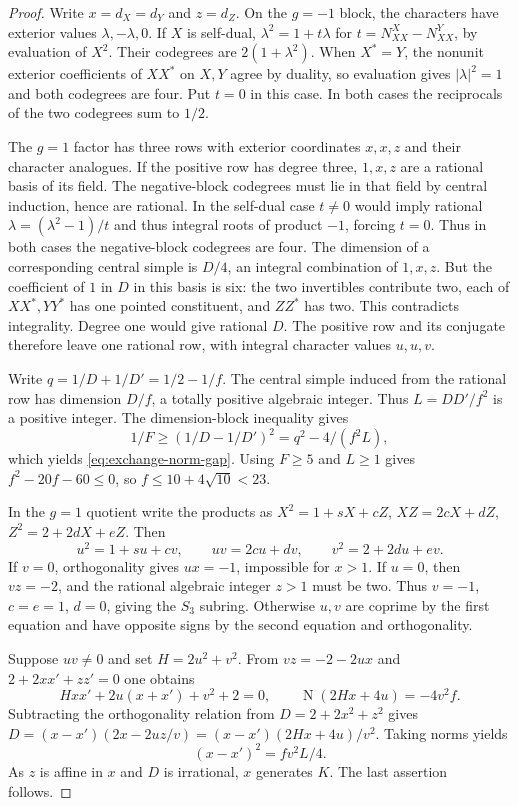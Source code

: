 \documentclass[11pt,a4paper]{article}
\numberwithin{equation}{section}
\begin{document}
\begin{proof}
Write $x=d_X=d_Y$ and $z=d_Z$.
On the $g=-1$ block, the characters have exterior values $\lambda,-\lambda,0$. If $X$ is self-dual, $\lambda^2=1+t\lambda$ for $t=N_{XX}^X-N_{XX}^Y$, by evaluation of $X^2$. Their codegrees are $2(1+\lambda^2)$. When $X^*=Y$, the nonunit exterior coefficients of $XX^*$ on $X,Y$ agree by duality, so evaluation gives $|\lambda|^2=1$ and both codegrees are four. Put $t=0$ in this case. In both cases the reciprocals of the two codegrees sum to $1/2$.

The $g=1$ factor has three rows with exterior coordinates $x,x,z$ and their character analogues. If the positive row has degree three, $1,x,z$ are a rational basis of its field. The negative-block codegrees must lie in that field by central induction, hence are rational. In the self-dual case $t\ne0$ would imply rational $\lambda=(\lambda^2-1)/t$ and thus integral roots of product $-1$, forcing $t=0$. Thus in both cases the negative-block codegrees are four. The dimension of a corresponding central simple is $D/4$, an integral combination of $1,x,z$. But the coefficient of $1$ in $D$ in this basis is six: the two invertibles contribute two, each of $XX^*,YY^*$ has one pointed constituent, and $ZZ^*$ has two. This contradicts integrality. Degree one would give rational $D$. The positive row and its conjugate therefore leave one rational row, with integral character values $u,u,v$.

Write $q=1/D+1/D'=1/2-1/f$. The central simple induced from the rational row has dimension $D/f$, a totally positive algebraic integer. Thus $L=DD'/f^2$ is a positive integer. The dimension-block inequality gives
\[
 1/F\ge(1/D-1/D')^2=q^2-4/(f^2L),
\]
which yields \eqref{eq:exchange-norm-gap}. Using $F\ge5$ and $L\ge1$ gives $f^2-20f-60\le0$, so $f\le 10+4\sqrt{10}<23$.

In the $g=1$ quotient write the products as
$X^2=1+sX+cZ$, $XZ=2cX+dZ$, $Z^2=2+2dX+eZ$. Then
\begin{equation}\label{eq:exchange-rational}
 u^2=1+su+cv,\qquad uv=2cu+dv,\qquad v^2=2+2du+ev .
\end{equation}
If $v=0$, orthogonality gives $ux=-1$, impossible for $x>1$. If $u=0$, then $vz=-2$, and the rational algebraic integer $z>1$ must be two. Thus $v=-1$, $c=e=1$, $d=0$, giving the $S_3$ subring. Otherwise $u,v$ are coprime by the first equation and have opposite signs by the second equation and orthogonality.

Suppose $uv\ne0$ and set $H=2u^2+v^2$. From $vz=-2-2ux$ and $2+2xx'+zz'=0$ one obtains
\[
 Hxx'+2u(x+x')+v^2+2=0,\qquad
 \operatorname{N}(2Hx+4u)=-4v^2 f .
\]
Subtracting the orthogonality relation from $D=2+2x^2+z^2$ gives
$D=(x-x')(2x-2uz/v)=(x-x')(2Hx+4u)/v^2$. Taking norms yields
\begin{equation}\label{eq:exchange-discriminant}
 (x-x')^2=fv^2L/4 .
\end{equation}
As $z$ is affine in $x$ and $D$ is irrational, $x$ generates $K$. The last assertion follows.
\end{proof}
\end{document}
